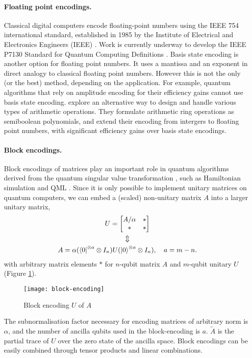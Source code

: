 \documentclass[10pt]{iopart}
\begin{document}
\paragraph{Floating point encodings.}  Classical digital computers encode floating-point numbers using the IEEE 754 international standard, established in 1985 by the Institute of Electrical and Electronics Engineers (IEEE) \cite{IEEE754}.  
Work is currently underway to develop the IEEE P7130 Standard for Quantum Computing Definitions \cite{IEEE7130}.
Basis state encoding is another option for floating point numbers. It uses a mantissa and an exponent in direct analogy to classical floating point numbers.
However this is not the only (or the best) method, depending on the application. 
For example, quantum algorithms that rely on amplitude encoding for their efficiency gains cannot use basis state encoding.
\citeauthor{Seidel2022} \cite{Seidel2022} explore an alternative way to design and handle various types of arithmetic operations. They formulate arithmetic ring operations as semiboolean polynomials, and extend their encoding from intergers to floating point numbers, with significant efficiency gains over basis state encodings.

\paragraph{Block encodings.}  Block encodings of matrices play an important role in quantum algorithms derived from the quantum singular value transformation \cite{Gilyen2019,Sunderhauf2023}, such as Hamiltonian simulation \cite{Berry2015} and QML \cite{Childs2017}. Since it is only possible to implement unitary matrices on quantum computers, we can embed a (scaled) non-unitary matrix $A$ into a larger unitary matrix,
\begin{gather}
U = \begin{bmatrix} A/\alpha & * \\ * & * \end{bmatrix}
\\
\Updownarrow \nonumber
\\
A = \alpha (\bra{0}^{\otimes a} \otimes I_n) U (\ket{0}^{\otimes a} \otimes I_n), \quad a=m-n.
\end{gather}
with arbitrary matrix elements $*$ for $n$-qubit matrix
$A$ and $m$-qubit unitary $U$ (Figure \ref{fig:block-encoding}). 

\begin{figure}[ht!]
\centering
\texttt{[image: block-encoding]}
\caption{Block encoding $U$ of $A$}
\label{fig:block-encoding}
\end{figure}
The subnormalisation factor necessary for encoding matrices of arbitrary norm is $\alpha$, and the number of ancilla qubits used in the block-encoding is $a$. $\tilde{A}$ is the partial trace of $U$ over the zero state of the ancilla space. Block encodings can be easily combined through tensor products and linear combinations. 
\end{document}
